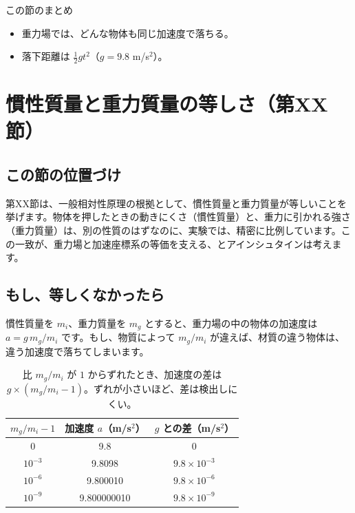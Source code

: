 \documentclass[a4paper,11pt,openany]{ltjsbook}
\begin{document}
\begin{pointbox}{この節のまとめ}
\begin{itemize}[leftmargin=*]
\item 重力場では、どんな物体も同じ加速度で落ちる。
\item 落下距離は $\tfrac12gt^2$（$g=9.8$ m/s$^2$）。
\end{itemize}
\end{pointbox}

\chapter{慣性質量と重力質量の等しさ（第XX節）}

\section{この節の位置づけ}

第XX節は、一般相対性原理の根拠として、慣性質量と重力質量が等しいことを挙げます。物体を押したときの動きにくさ（慣性質量）と、重力に引かれる強さ（重力質量）は、別の性質のはずなのに、実験では、精密に比例しています。この一致が、重力場と加速座標系の等価を支える、とアインシュタインは考えます。

\section{もし、等しくなかったら}

慣性質量を $m_i$、重力質量を $m_g$ とすると、重力場の中の物体の加速度は $a=g\,m_g/m_i$ です。もし、物質によって $m_g/m_i$ が違えば、材質の違う物体は、違う加速度で落ちてしまいます。

\begin{table}[htbp]
\centering
\begin{tabular}{c|cc}
\toprule
$m_g/m_i-1$ & 加速度 $a$（m/s$^2$） & $g$ との差（m/s$^2$）\\
\midrule
0 & 9.8 & 0\\
$10^{-3}$ & 9.8098 & $9.8\times10^{-3}$\\
$10^{-6}$ & 9.800010 & $9.8\times10^{-6}$\\
$10^{-9}$ & 9.800000010 & $9.8\times10^{-9}$\\
\bottomrule
\end{tabular}
\caption{比 $m_g/m_i$ が $1$ からずれたとき、加速度の差は $g\times(m_g/m_i-1)$。ずれが小さいほど、差は検出しにくい。}
\end{table}
\end{document}
